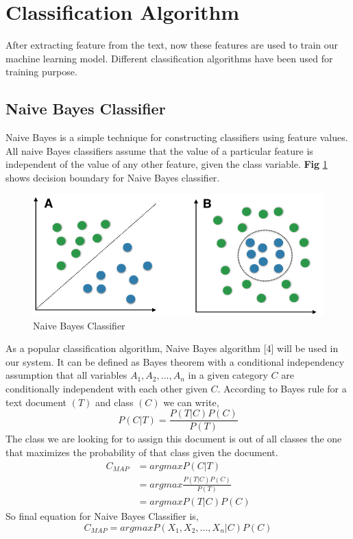 \documentclass[12pt,a4paper]{report}
\begin{document}
\section{Classification Algorithm}
After extracting feature from the text, now these features are used to train our machine learning model. Different classification algorithms have been used for training purpose.

\subsection{Naive Bayes Classifier}
Naive Bayes is a simple technique for constructing classifiers using feature values. All naive Bayes classifiers assume that the value of a particular feature is independent of the value of any other feature, given the class variable. \textbf{Fig} \ref{fig:NBC} shows decision boundary for Naive Bayes classifier.

\begin{figure}[h!]
    \centering
    \includegraphics[scale=0.4]{Figures/naive_bayes.png}
    \caption{Naive Bayes Classifier}
    \label{fig:NBC}
\end{figure}

As a popular classification algorithm, Naive Bayes algorithm [4] will be used in our system. It can be defined as Bayes theorem with a conditional independency assumption that all variables $A_{1},A_{2},...,A_{n}$ in a given category $C$ are conditionally independent with each other given $C$. 
According to Bayes rule for a text document $(T)$ and class $(C)$ we can write,$$ P(C|T) = \frac{P(T|C)P(C)}{P(T)}$$
The class we are looking for to assign this document is out of all classes the one that maximizes the probability of that class given the document.
\begin{equation}\label{eq:11}
 \begin{aligned}
     C_{MAP} & = argmax P(C|T) \\     & = argmax \frac{P(T|C)P(C)}{P(T)}\\
    & = argmax {P(T|C)P(C)}
\end{aligned}
\end{equation}
So final equation for Naive Bayes Classifier is,
\begin{equation}
     C_{MAP} = argmax P(X_{1},X_{2},...,X_{n}|C)P(C)
\end{equation}
   
\end{document}
